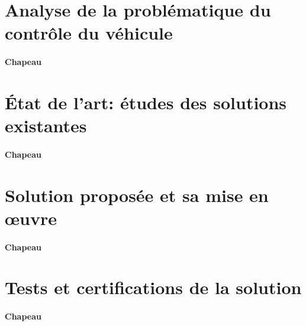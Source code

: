 \section{Analyse de la problématique du contrôle du véhicule} \label{sec:ProblematiqueControleDuvehicule}

\paragraph{Chapeau}


\section{État de l’art: études des solutions existantes} \label{sec:etatDeLart1}

\paragraph{Chapeau}


\section{Solution proposée et sa mise en œuvre} \label{sec:solution1}

\paragraph{Chapeau}


\section{Tests et certifications de la solution} \label{sec:test1}

\paragraph{Chapeau}
